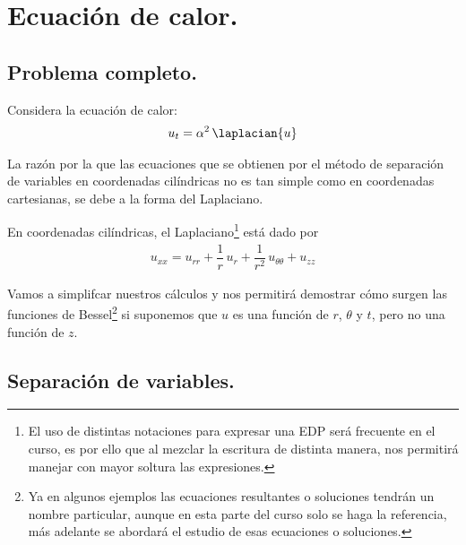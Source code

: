 \section{Ecuación de calor.}
\subsection{Problema completo.}

Considera la ecuación de calor:
\begin{align*}
u_{t} =  \alpha^{2} \,  \laplacian{u}
\end{align*}

La razón por la que las ecuaciones que se obtienen por el método de separación de variables en coordenadas cilíndricas no es tan simple como en coordenadas cartesianas, se debe a la forma del Laplaciano. 

En coordenadas cilíndricas, el Laplaciano\footnote{El uso de distintas notaciones para expresar una EDP será frecuente en el curso, es por ello que al mezclar la escritura de distinta manera, nos permitirá manejar con mayor soltura las expresiones.} está dado por
\begin{align*}
u_{xx} = u_{rr} + \dfrac{1}{r} \, u_{r} + \dfrac{1}{r^{2}} \, u_{\theta \theta} + u_{zz}
\end{align*}

Vamos a simplifcar nuestros cálculos y nos permitirá demostrar cómo surgen las funciones de Bessel\footnote{Ya en algunos ejemplos las ecuaciones resultantes o soluciones tendrán un nombre particular, aunque en esta parte del curso solo se haga la referencia, más adelante se abordará el estudio de esas ecuaciones o soluciones.} si suponemos que $u$ es una función de $r$, $\theta$ y $t$, pero no una función de $z$.

\subsection{Separación de variables.}

